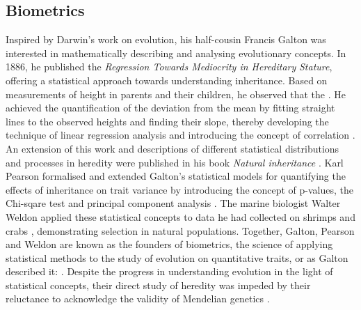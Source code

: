 \subsection{Biometrics}
Inspired by Darwin's work on evolution, his half-cousin Francis Galton was interested in mathematically describing and analysing evolutionary concepts. In 1886, he published the \textit{Regression Towards Mediocrity in Hereditary} \textit{Stature}, offering a statistical approach towards understanding inheritance. Based on measurements of height in parents and their children, he observed that the . He achieved the quantification of the deviation from the mean by fitting straight lines to the observed heights and finding their slope, thereby developing the technique of linear regression analysis and introducing the concept of correlation \citep{Galton1886}. An extension of this work and descriptions of different statistical distributions and processes in heredity were published in his book \textit{Natural inheritance} \citep{Galton1889}. Karl Pearson formalised and extended Galton's statistical models for quantifying the effects of inheritance on trait variance by introducing the concept of p-values, the Chi-sqare test and principal component analysis \citep{Pearson1900,Pearson1901}. The marine biologist Walter Weldon applied these statistical concepts to data he had collected on shrimps and crabs \citep{Weldon1890, Weldon1892}, demonstrating selection in natural populations. Together, Galton, Pearson and Weldon are known as the founders of biometrics, the science of applying statistical methods to the study of evolution on quantitative traits, or as Galton described it:  \citep[editorial]{Galton1901}. Despite the progress in understanding evolution in the light of statistical concepts, their direct study of heredity was impeded by their reluctance to acknowledge the validity of Mendelian genetics \citep{Bulmer2003}.

